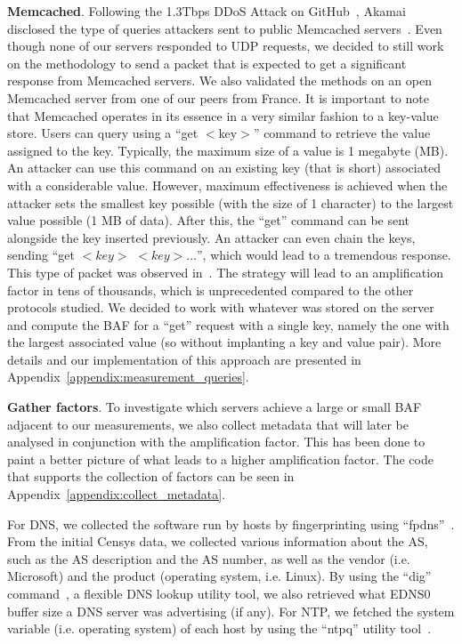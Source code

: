  \textbf{Memcached}. Following the 1.3Tbps DDoS Attack on GitHub~\cite{wired_ddos}, Akamai disclosed the type of queries attackers sent to public Memcached servers~\cite{akamai2018attackspotlight}. Even though none of our servers responded to UDP requests, we decided to still work on the methodology to send a packet that is expected to get a significant response from Memcached servers. We also validated the methods on an open Memcached server from one of our peers from France. It is important to note that Memcached operates in its essence in a very similar fashion to a key-value store. Users can query using a ``get $<$key$>$'' command to retrieve the value assigned to the key. Typically, the maximum size of a value is 1 megabyte (MB). An attacker can use this command on an existing key (that is short) associated with a considerable value. However, maximum effectiveness is achieved when the attacker sets the smallest key possible (with the size of 1 character) to the largest value possible (1 MB of data). After this, the ``get'' command can be sent alongside the key inserted previously. An attacker can even chain the keys, sending ``get $<key>$ $<key>...$'', which would lead to a tremendous response. This type of packet was observed in~\cite{akamai2018attackspotlight}. The strategy will lead to an amplification factor in tens of thousands, which is unprecedented compared to the other protocols studied. We decided to work with whatever was stored on the server and compute the BAF for a ``get'' request with a single key, namely the one with the largest associated value (so without implanting a key and value pair). More details and our implementation of this approach are presented in Appendix~\ref{appendix:measurement_queries}.


 \textbf{Gather factors}. To investigate which servers achieve a large or small BAF adjacent to our measurements, we also collect metadata that will later be analysed in conjunction with the amplification factor. This has been done to paint a better picture of what leads to a higher amplification factor. The code that supports the collection of factors can be seen in Appendix~\ref{appendix:collect_metadata}.

 For DNS, we collected the software run by hosts by fingerprinting using ``fpdns''~\cite{fpdns_kirei}. From the initial Censys data, we collected various information about the AS, such as the AS description and the AS number, as well as the vendor (i.e. Microsoft) and the product (operating system, i.e. Linux). By using the ``dig'' command~\cite{dig}, a flexible DNS lookup utility tool, we also retrieved what EDNS0 buffer size a DNS server was advertising (if any). For NTP, we fetched the system variable (i.e. operating system) of each host by using the ``ntpq'' utility tool~\cite{ntpq}.
    
